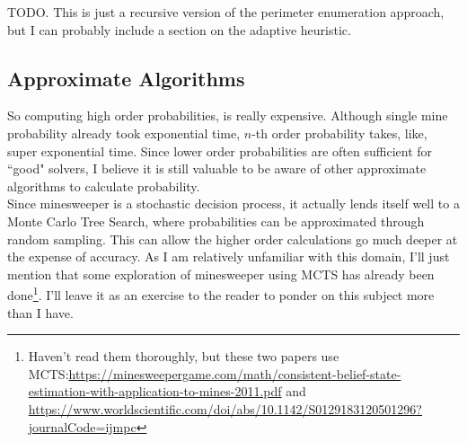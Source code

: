 TODO. This is just a recursive version of the perimeter enumeration approach, but I can probably include a section on the adaptive heuristic.\\

\subsection{Approximate Algorithms}

So computing high order probabilities, is really expensive. Although single mine probability already took exponential time, $n$-th order probability takes, like, super exponential time. Since lower order probabilities are often sufficient for ``good" solvers, I believe it is still valuable to be aware of other approximate algorithms to calculate probability.\\

Since minesweeper is a stochastic decision process, it actually lends itself well to a Monte Carlo Tree Search, where probabilities can be approximated through random sampling. This can allow the higher order calculations go much deeper at the expense of accuracy. As I am relatively unfamiliar with this domain, I'll just mention that some exploration of minesweeper using MCTS has already been done\footnote{Haven't read them thoroughly, but these two papers use MCTS:\url{https://minesweepergame.com/math/consistent-belief-state-estimation-with-application-to-mines-2011.pdf} and \url{https://www.worldscientific.com/doi/abs/10.1142/S0129183120501296?journalCode=ijmpc}}. I'll leave it as an exercise to the reader to ponder on this subject more than I have.\\
